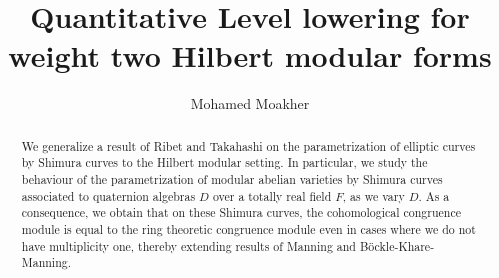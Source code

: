 \documentclass[a4paper, notitlepage, 10pt]{amsart}
\author[M.~Moakher]{Mohamed Moakher}
\theoremstyle{plain} %
\theoremstyle{definition} %
\theoremstyle{remark} %
\numberwithin{equation}{section}
\begin{document}
\title{Quantitative Level lowering for weight two Hilbert modular forms}



\makeatletter
{}
\makeatother



\setcounter{tocdepth}{1}



\begin{abstract}
    We generalize a result of Ribet and Takahashi on the parametrization of elliptic curves by Shimura curves to the Hilbert modular setting. In particular, we study the behaviour of the parametrization of modular abelian varieties by Shimura curves associated to quaternion algebras $D$ over a totally real field $F$, as we vary $D$. As a consequence, we obtain that on these Shimura curves, the cohomological congruence module is equal to the ring theoretic congruence module even in cases where we do not have multiplicity one, thereby extending results of Manning and Böckle-Khare-Manning. 
\end{abstract}

\maketitle

\tableofcontents
\end{document}
